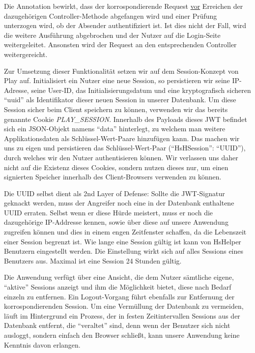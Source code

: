 \documentclass[12pt,DIV14,BCOR10mm,a4paper,parskip=half-,headsepline,headinclude,english,ngerman,bibliography=totocnumbered]{scrreprt}
\begin{document}
Die Annotation bewirkt, dass der korrospondierende Request \underline{vor} Erreichen der dazugehörigen Controller-Methode abgefangen wird und einer Prüfung unterzogen wird, ob der Absender authentifiziert ist. Ist dies nicht der Fall, wird die weitere Ausführung abgebrochen und der Nutzer auf die Login-Seite weitergeleitet. Ansonsten wird der Request an den entsprechenden Controller weitergereicht.

Zur Umsetzung dieser Funktionalität setzen wir auf dem Session-Konzept von Play auf.
Initialisiert ein Nutzer eine neue Session, so persistieren wir seine IP-Adresse, seine User-ID, das Initialisierungsdatum und eine kryptografisch sicheren \enquote{\gls{uuid}} als Identifikator dieser neuen Session in unserer Datenbank. \linebreak
Um diese Session sicher beim Client speichern zu können, verwenden wir das bereits genannte Cookie \textit{PLAY\_SESSION}.
Innerhalb des Payloads dieses JWT befindet sich ein JSON-Objekt namens \enquote{data} hinterlegt, zu welchem man weitere Applikationsdaten als Schlüssel-Wert-Paare hinzufügen kann.
Das machen wir uns zu eigen und persistieren das Schlüssel-Wert-Paar (\enquote{HsHSession}: \enquote{UUID}), durch welches wir den Nutzer authentisieren können.
Wir verlassen uns daher nicht auf die Existenz dieses Cookies, sondern nutzen dieses nur, um einen signierten Speicher innerhalb des Client-Browsers verwenden zu können.

Die UUID selbst dient als 2nd Layer of Defense: Sollte die JWT-Signatur geknackt werden, muss der Angreifer noch eine in der Datenbank enthaltene UUID erraten. Selbst wenn er diese Hürde meistert, muss er noch die dazugehörige IP-Addresse kennen, sowie über diese auf unsere Anwendung zugreifen können und dies in einem engen Zeitfenster schaffen, da die Lebenszeit einer Session begrenzt ist. Wie lange eine Session gültig ist kann von HsHelper Benutzern eingestellt werden. Die Einstellung wirkt sich auf alles Sessions eines Benutzers aus. Maximal ist eine Session 24 Stunden gültig.

Die Anwendung verfügt über eine Ansicht, die dem Nutzer sämtliche eigene, \enquote{aktive} Sessions anzeigt und ihm die Möglichkeit bietet, diese nach Bedarf einzeln zu entfernen. Ein Logout-Vorgang führt ebenfalls zur Entfernung der korrospondierenden Session. Um eine Vermüllung der Datenbank zu vermeiden, läuft im Hintergrund ein Prozess, der in festen Zeitintervallen Sessions aus der Datenbank entfernt, die \enquote{veraltet} sind, denn wenn der Benutzer sich nicht ausloggt, sondern einfach den Browser schließt, kann unsere Anwendung keine Kenntnis davon erlangen.
\end{document}

